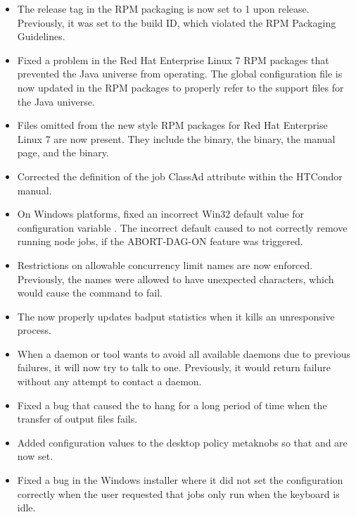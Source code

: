 \begin{itemize}
\item 
The release tag in the RPM packaging is now set to 1 upon release.
Previously, it was set to the build ID, which violated the RPM Packaging
Guidelines.

\item Fixed a problem in the Red Hat Enterprise Linux 7 RPM packages
that prevented the Java universe from operating.
The global configuration file is now updated in the RPM packages
to properly refer to the support files for the Java universe.

\item Files omitted from the new style RPM packages 
for Red Hat Enterprise Linux 7 are now present.
They include
the  binary, the  binary,
the  manual page, 
and the  binary.

\item Corrected the definition of the job ClassAd attribute 
 within the HTCondor manual.

\item On Windows platforms, fixed an incorrect Win32 default value for
configuration variable .
The incorrect default caused 
to not correctly remove running node jobs,
if the ABORT-DAG-ON feature was triggered.

\item Restrictions on allowable concurrency limit names are now enforced.
Previously, the names were allowed to have unexpected characters, which
would cause the  command to fail.

\item The  now properly updates badput statistics when
it kills an unresponsive  process.

\item When a daemon or tool wants to avoid all available 
 daemons due to previous failures, 
it will now try to talk to one.
Previously, it would return failure without any attempt to contact a
 daemon.

\item Fixed a bug that caused the  to hang for a long
period of time when the transfer of output files fails.

\item Added configuration values to the desktop policy metaknobs so that
 and  are now set.

\item Fixed a bug in the Windows installer where it did not set the configuration
correctly when the user requested that jobs only run when the keyboard is idle.

\end{itemize}

